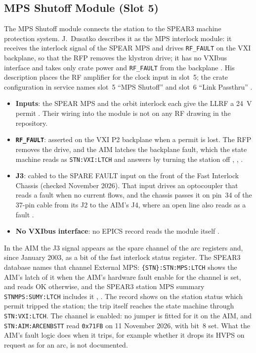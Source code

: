 \subsection{MPS Shutoff Module (Slot 5)}\label{sec:mps-shutoff}

The MPS Shutoff module connects the station to the SPEAR3 machine protection system. J.~Dusatko describes it as the MPS interlock module: it receives the interlock signal of the SPEAR MPS and drives \texttt{RF\_FAULT} on the VXI backplane, so that the RFP removes the klystron drive; it has no VXIbus interface and takes only crate power and \texttt{RF\_FAULT} from the backplane . His description places the RF amplifier for the clock input in slot~5; the crate configuration in service names slot~5 ``MPS Shutoff'' and slot~6 ``Link Passthru'' .

\begin{itemize}
\tightlist
\item
  \textbf{Inputs}: the SPEAR MPS and the orbit interlock each give the LLRF a 24~V permit . Their wiring into the module is not on any RF drawing in the repository.
\item
  \textbf{\texttt{RF\_FAULT}}: asserted on the VXI P2 backplane when a permit is lost. The RFP removes the drive, and the AIM latches the backplane fault, which the state machine reads as \texttt{STN:VXI:LTCH} and answers by turning the station off , , .
\item
  \textbf{J3}: cabled to the SPARE FAULT input on the front of the Fast Interlock Chassis (checked November 2026). That input drives an optocoupler that reads a fault when no current flows, and the chassis passes it on pin~34 of the 37-pin cable from its J2 to the AIM's J4, where an open line also reads as a fault .
\item
  \textbf{No VXIbus interface}: no EPICS record reads the module itself .
\end{itemize}

In the AIM the J3 signal appears as the spare channel of the arc registers and, since January 2003, as a bit of the fast interlock status register. The SPEAR3 database names that channel External MPS: \texttt{\{STN\}:STN:MPS:LTCH} shows the AIM's latch of it when the AIM's hardware fault enable for the channel is set, and reads OK otherwise, and the SPEAR3 station MPS summary \texttt{STNMPS:SUMY:LTCH} includes it , . The record shows on the station status which permit tripped the station; the trip itself reaches the state machine through \texttt{STN:VXI:LTCH}. The channel is enabled: no jumper is fitted for it on the AIM, and \texttt{STN:AIM:ARCENBSTT} read \texttt{0x71FB} on 11 November 2026, with bit~8 set. What the AIM's fault logic does when it trips, for example whether it drops its HVPS on request as for an arc, is not documented.

